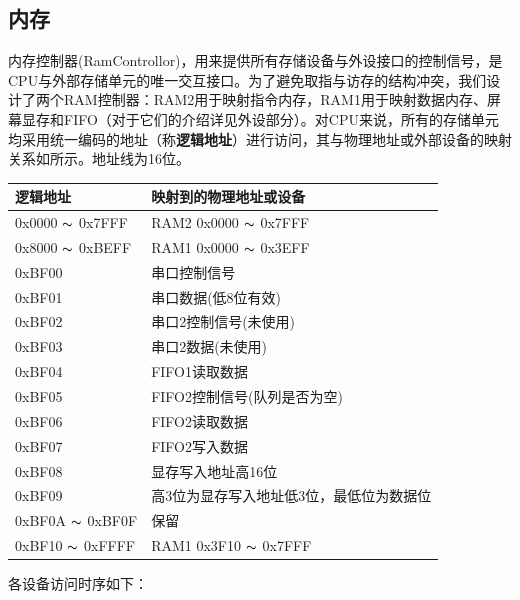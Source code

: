\subsection{内存}

内存控制器(RamControllor)，用来提供所有存储设备与外设接口的控制信号，是CPU与外部存储单元的唯一交互接口。为了避免取指与访存的结构冲突，我们设计了两个RAM控制器：RAM2用于映射指令内存，RAM1用于映射数据内存、屏幕显存和FIFO（对于它们的介绍详见外设部分）。对CPU来说，所有的存储单元均采用统一编码的地址（称\textbf{逻辑地址}）进行访问，其与物理地址或外部设备的映射关系如所示。地址线为16位。

\begin{center}
    \label{table:mem_addr}
    \begin{longtable}{ll}
        \toprule
        逻辑地址 & 映射到的物理地址或设备 \\
        \midrule
        0x0000 $\thicksim$ 0x7FFF & RAM2 0x0000 $\thicksim$ 0x7FFF \\
        0x8000 $\thicksim$ 0xBEFF & RAM1 0x0000 $\thicksim$ 0x3EFF \\
        0xBF00 & 串口控制信号 \\
        0xBF01 & 串口数据(低8位有效) \\
        0xBF02 & 串口2控制信号(未使用) \\
        0xBF03 & 串口2数据(未使用) \\
        0xBF04 & FIFO1读取数据 \\
        0xBF05 & FIFO2控制信号(队列是否为空) \\
        0xBF06 & FIFO2读取数据 \\
        0xBF07 & FIFO2写入数据 \\
        0xBF08 & 显存写入地址高16位 \\
        0xBF09 & 高3位为显存写入地址低3位，最低位为数据位 \\
        0xBF0A $\thicksim$ 0xBF0F & 保留 \\
        0xBF10 $\thicksim$ 0xFFFF & RAM1 0x3F10 $\thicksim$ 0x7FFF \\
        \bottomrule
    \end{longtable}
\end{center}

各设备访问时序如下：


